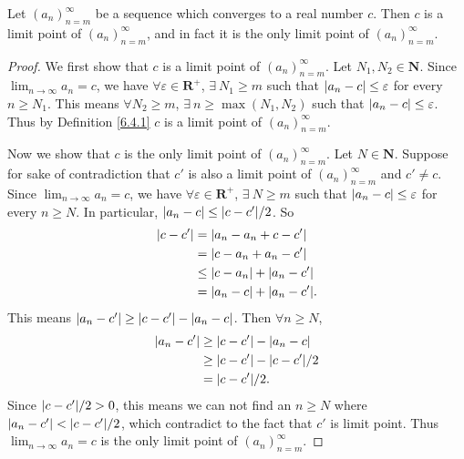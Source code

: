 \setcounter{theorem}{4}
\begin{proposition}\label{6.4.5}
    Let \((a_n)_{n = m}^\infty\) be a sequence which converges to a real number \(c\).
    Then \(c\) is a limit point of \((a_n)_{n = m}^\infty\), and in fact it is the only limit point of \((a_n)_{n = m}^\infty\).
\end{proposition}

\begin{proof}
    We first show that \(c\) is a limit point of \((a_n)_{n = m}^\infty\).
    Let \(N_1, N_2 \in \mathbf{N}\).
    Since \(\lim_{n \to \infty} a_n = c\), we have \(\forall \varepsilon \in \mathbf{R}^+\), \(\exists\ N_1 \geq m\) such that \(\abs*{a_n - c} \leq \varepsilon\) for every \(n \geq N_1\).
    This means \(\forall N_2 \geq m\), \(\exists\ n \geq \max(N_1, N_2)\) such that \(\abs*{a_n - c} \leq \varepsilon\).
    Thus by Definition \ref{6.4.1} \(c\) is a limit point of \((a_n)_{n = m}^\infty\).

    Now we show that \(c\) is the only limit point of \((a_n)_{n = m}^\infty\).
    Let \(N \in \mathbf{N}\).
    Suppose for sake of contradiction that \(c'\) is also a limit point of \((a_n)_{n = m}^\infty\) and \(c' \neq c\).
    Since \(\lim_{n \to \infty} a_n = c\), we have \(\forall \varepsilon \in \mathbf{R}^+\), \(\exists\ N \geq m\) such that \(\abs*{a_n - c} \leq \varepsilon\) for every \(n \geq N\).
    In particular, \(\abs*{a_n - c} \leq \abs*{c - c'} / 2\).
    So
    \begin{align*}
        \abs*{c - c'} & = \abs*{a_n - a_n + c - c'}           \\
                      & = \abs*{c - a_n + a_n - c'}           \\
                      & \leq \abs*{c - a_n} + \abs*{a_n - c'} \\
                      & = \abs*{a_n - c} + \abs*{a_n - c'}.
    \end{align*}
    This means \(\abs*{a_n - c'} \geq \abs*{c - c'} - \abs*{a_n - c}\).
    Then \(\forall n \geq N\),
    \begin{align*}
        \abs*{a_n - c'} & \geq \abs*{c - c'} - \abs*{a_n - c}    \\
                        & \geq \abs*{c - c'} - \abs*{c - c'} / 2 \\
                        & = \abs*{c - c'} / 2.
    \end{align*}
    Since \(\abs*{c - c'} / 2 > 0\), this means we can not find an \(n \geq N\) where \(\abs*{a_n - c'} < \abs*{c - c'} / 2\), which contradict to the fact that \(c'\) is limit point.
    Thus \(\lim_{n \to \infty} a_n = c\) is the only limit point of \((a_n)_{n = m}^\infty\).
\end{proof}

